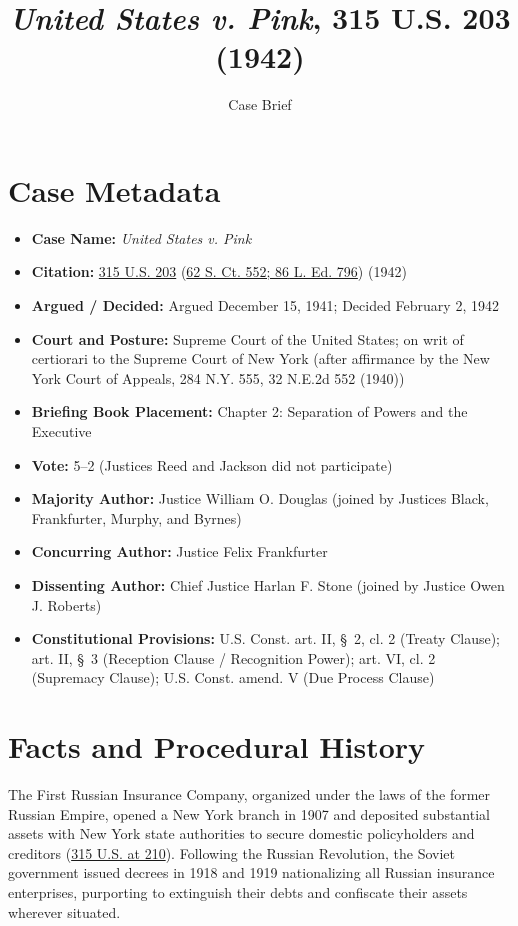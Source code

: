 \documentclass[12pt]{article}
\title{\textit{United States v. Pink}, 315 U.S. 203 (1942)}
\author{Case Brief}
\date{}
\begin{document}
\maketitle

\section{Case Metadata}
\begin{itemize}
  \item \textbf{Case Name:} \textit{United States v. Pink}
  \item \textbf{Citation:} \href{https://supreme.justia.com/cases/federal/us/315/203/}{315 U.S. 203} (\href{https://www.law.cornell.edu/supremecourt/text/315/203}{62 S. Ct. 552; 86 L. Ed. 796}) (1942)
  \item \textbf{Argued / Decided:} Argued December 15, 1941; Decided February 2, 1942
  \item \textbf{Court and Posture:} Supreme Court of the United States; on writ of certiorari to the Supreme Court of New York (after affirmance by the New York Court of Appeals, 284 N.Y. 555, 32 N.E.2d 552 (1940))
  \item \textbf{Briefing Book Placement:} Chapter 2: Separation of Powers and the Executive
  \item \textbf{Vote:} 5--2 (Justices Reed and Jackson did not participate)
  \item \textbf{Majority Author:} Justice William O. Douglas (joined by Justices Black, Frankfurter, Murphy, and Byrnes)
  \item \textbf{Concurring Author:} Justice Felix Frankfurter
  \item \textbf{Dissenting Author:} Chief Justice Harlan F. Stone (joined by Justice Owen J. Roberts)
  \item \textbf{Constitutional Provisions:} U.S. Const. art. II, \S~2, cl. 2 (Treaty Clause); art. II, \S~3 (Reception Clause / Recognition Power); art. VI, cl. 2 (Supremacy Clause); U.S. Const. amend. V (Due Process Clause)
\end{itemize}

\section{Facts and Procedural History}
The First Russian Insurance Company, organized under the laws of the former Russian Empire, opened a New York branch in 1907 and deposited substantial assets with New York state authorities to secure domestic policyholders and creditors (\href{https://www.law.cornell.edu/supremecourt/text/315/203}{315 U.S. at 210}). Following the Russian Revolution, the Soviet government issued decrees in 1918 and 1919 nationalizing all Russian insurance enterprises, purporting to extinguish their debts and confiscate their assets wherever situated.
\end{document}
